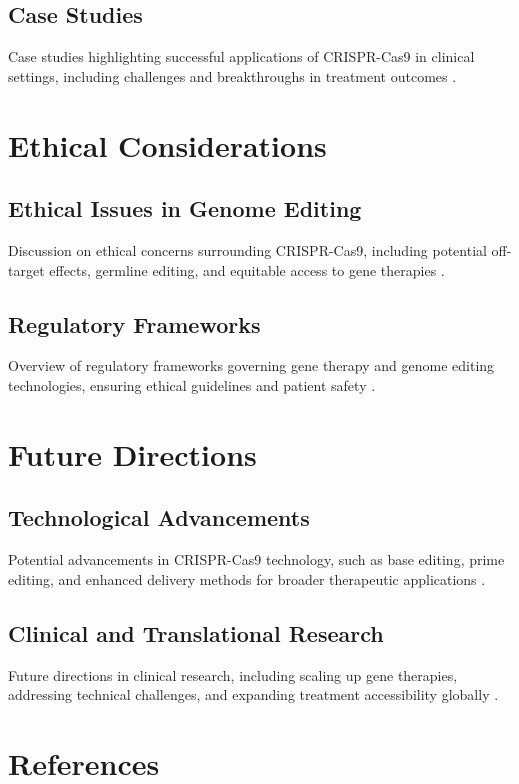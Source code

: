 \documentclass[12pt]{article}
\begin{document}
\subsection{Case Studies}
Case studies highlighting successful applications of CRISPR-Cas9 in clinical settings, including challenges and breakthroughs in treatment outcomes \citep{tebas2014gene, tabebordbar2016efficient}.

\section{Ethical Considerations}
\subsection{Ethical Issues in Genome Editing}
Discussion on ethical concerns surrounding CRISPR-Cas9, including potential off-target effects, germline editing, and equitable access to gene therapies \citep{savulescu2015new, lanphier2015don}.

\subsection{Regulatory Frameworks}
Overview of regulatory frameworks governing gene therapy and genome editing technologies, ensuring ethical guidelines and patient safety \citep{regalado2015who, hsu2014regulatory}.

\section{Future Directions}
\subsection{Technological Advancements}
Potential advancements in CRISPR-Cas9 technology, such as base editing, prime editing, and enhanced delivery methods for broader therapeutic applications \citep{ansell2017genome, anzalone2019search}.

\subsection{Clinical and Translational Research}
Future directions in clinical research, including scaling up gene therapies, addressing technical challenges, and expanding treatment accessibility globally \citep{cong2013multiplex, nelson2015genome}.

\section*{References}


\end{document}
